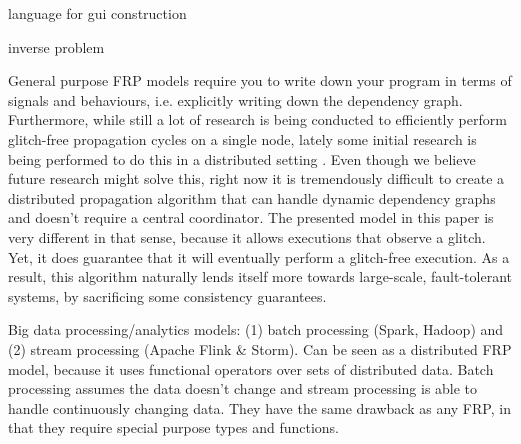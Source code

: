 \cite{burckhardt-leijen-yi-sadowski-ball-OOPSLA11}
\cite{camil}


\cite{alive}
\cite{react}

\cite{elm} language for gui construction

\cite{statelines} inverse problem




General purpose FRP models \cite{reactivesurvey} require you to write down your program in terms of signals and behaviours, i.e. explicitly writing down the dependency graph. Furthermore, while still a lot of research is being conducted to efficiently perform glitch-free propagation cycles on a single node, lately some initial research is being performed to do this in a distributed setting \cite{elm}\cite{drescala}. Even though we believe future research might solve this, right now it is tremendously difficult to create a distributed propagation algorithm that can handle dynamic dependency graphs and doesn't require a central coordinator. The presented model in this paper is very different in that sense, because it allows executions that observe a glitch. Yet, it does guarantee that it will eventually perform a glitch-free execution. As a result, this algorithm naturally lends itself more towards large-scale, fault-tolerant systems, by sacrificing some consistency guarantees.


Big data processing/analytics models: (1) batch processing (Spark, Hadoop) \cite{mapreduce} and (2) stream processing (Apache Flink \& Storm). Can be seen as a  distributed FRP model, because it uses functional operators over sets of distributed data. Batch processing assumes the data doesn't change and stream processing is able to handle continuously changing data. They have the same drawback as any FRP, in that they require special purpose types and functions.

